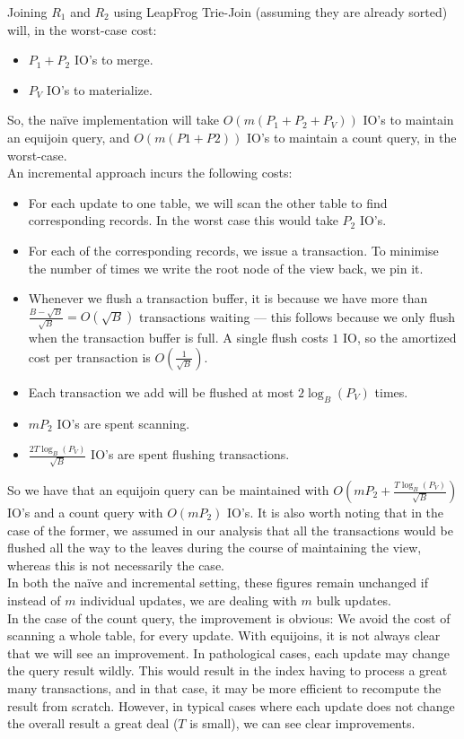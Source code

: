 Joining $R_1$ and $R_2$ using LeapFrog Trie-Join (assuming they are already sorted) will, in the worst-case cost:
\begin{itemize}
  \item $P_1 + P_2$ IO's to merge.
  \item $P_V$ IO's to materialize.
\end{itemize}
So, the na\"ive implementation will take $O(m(P_1 + P_2 + P_V))$ IO's to maintain an equijoin query, and $O(m(P1 + P2))$ IO's to maintain a count query, in the worst-case.\\[1em]

An incremental approach incurs the following costs:
\begin{itemize}
  \item For each update to one table, we will scan the other table to find corresponding records. In the worst case this would take $P_2$ IO's.
  \item For each of the corresponding records, we issue a transaction. To minimise the number of times we write the root node of the view back, we pin it.
  \item Whenever we flush a transaction buffer, it is because we have more than $\frac{B - \sqrt{B}}{\sqrt{B}}=O(\sqrt{B})$ transactions waiting --- this follows because we only flush when the transaction buffer is full. A single flush costs $1$ IO, so the amortized cost per transaction is $O(\frac{1}{\sqrt{B}})$.
  \item Each transaction we add will be flushed at most $2\log_B(P_V)$ times.
  \item $mP_2$ IO's are spent scanning.
  \item $\frac{2T\log_B(P_V)}{\sqrt{B}}$ IO's are spent flushing transactions.
\end{itemize}

So we have that an equijoin query can be maintained with ${O(mP_2 + \frac{T\log_B(P_V)}{\sqrt{B}})}$ IO's and a count query with $O(mP_2)$ IO's. It is also worth noting that in the case of the former, we assumed in our analysis that all the transactions would be flushed all the way to the leaves during the course of maintaining the view, whereas this is not necessarily the case.\\[1em]

In both the na\"ive and incremental setting, these figures remain unchanged if instead of $m$ individual updates, we are dealing with $m$ bulk updates.\\[1em]

In the case of the count query, the improvement is obvious: We avoid the cost of scanning a whole table, for every update. With equijoins, it is not always clear that we will see an improvement. In pathological cases, each update may change the query result wildly. This would result in the index having to process a great many transactions, and in that case, it may be more efficient to recompute the result from scratch. However, in typical cases where each update does not change the overall result a great deal ($T$ is small), we can see clear improvements.

